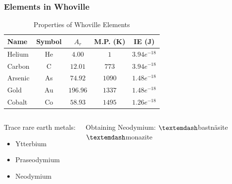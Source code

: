 \documentclass[unknownkeysallowed]{beamer}
\begin{document}
\begin{frame}
    \frametitle{Elements in Whoville}

    \vspace{1cm} %
    \begin{table}[h]
    \centering
    \begin{tabular}{lcccc} \bottomrule[2pt]
        Name & Symbol & $A_r$ & M.P. (K) & IE (J) \\ \bottomrule 
        Helium & He & $4.00$ & $1$ & $3.94e^{-18}$ \\
        Carbon & C & $12.01$ & $773$ & $3.94e^{-18}$ \\
        Arsenic & As & $74.92$ & $1090$ & $1.48e^{-18}$ \\
        Gold & Au & $196.96$ & $1337$ & $1.48e^{-18}$ \\
        Cobalt & Co & $58.93$ & $1495$ & $1.26e^{-18}$ \\
    \bottomrule[2pt]
    \end{tabular}
    \caption{Properties of Whoville Elements}
    \end{table}

\vspace{-0.6cm} %

    \begin{columns}[t]
    \column{4.5cm}
    \begin{block}{Trace rare earth metals:}
    \begin{itemize}
        \item{Ytterbium}
        \item{Praseodymium}
        \item{Neodymium}
    \end{itemize}
    \end{block}
    \column{4.5cm}
    \begin{block}{Obtaining Neodymium:}
        \vspace{0.15cm}
        $\textemdash$bastn\"{a}site \\
        $\textemdash${monazite} \\
    \end{block}
    \end{columns}


\end{frame}
\end{document}
